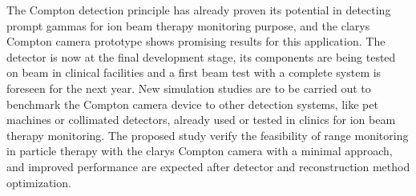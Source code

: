 The Compton detection principle has already proven its potential in detecting prompt gammas for ion beam therapy monitoring purpose, and the \gls{clarys} Compton camera prototype shows promising results for this application. The detector is now at the final development stage, its components are being tested on beam in clinical facilities and a first beam test with a complete system is foreseen for the next year. New simulation studies are to be carried out to benchmark the Compton camera device to other detection systems, like \gls{pet} machines or collimated detectors, already used or tested in clinics for ion beam therapy monitoring. The proposed study verify the feasibility of range monitoring in particle therapy with the \gls{clarys} Compton camera with a minimal approach, and improved performance are expected after detector and reconstruction method optimization.            



\clearpage
